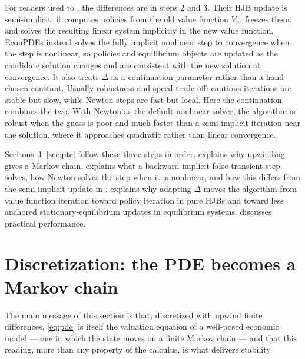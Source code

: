 \documentclass[11pt]{article}
\numberwithin{equation}{section}
\begin{document}
		For readers used to \citet{achdou2022income}, the differences are in steps 2 and 3. Their HJB update is semi-implicit: it computes policies from the old value function $V_n$, freezes them, and solves the resulting linear system implicitly in the new value function. EconPDEs instead solves the fully implicit nonlinear step to convergence when the step is nonlinear, so policies and equilibrium objects are updated as the candidate solution changes and are consistent with the new solution at convergence. It also treats $\Delta$ as a continuation parameter rather than a hand-chosen constant. Usually robustness and speed trade off: cautious iterations are stable but slow, while Newton steps are fast but local. Here the continuation combines the two. With Newton as the default nonlinear solver, the algorithm is robust when the guess is poor and much faster than a semi-implicit iteration near the solution, where it approaches quadratic rather than linear convergence.

		Sections~\ref{sec:disc}--\ref{sec:ptc} follow these three steps in order.  explains why upwinding gives a Markov chain.  explains what a backward implicit false-transient step solves, how Newton solves the step when it is nonlinear, and how this differs from the semi-implicit update in \citet{achdou2022income}.  explains why adapting $\Delta$ moves the algorithm from value function iteration toward policy iteration in pure HJBs and toward less anchored stationary-equilibrium updates in equilibrium systems.  discusses practical performance.

	\section{Discretization: the PDE becomes a Markov chain}\label{sec:disc}

	The main message of this section is that, discretized with upwind finite differences, \eqref{eq:pde} is itself the valuation equation of a well-posed economic model --- one in which the state moves on a finite Markov chain --- and that this reading, more than any property of the calculus, is what delivers stability.
\end{document}
